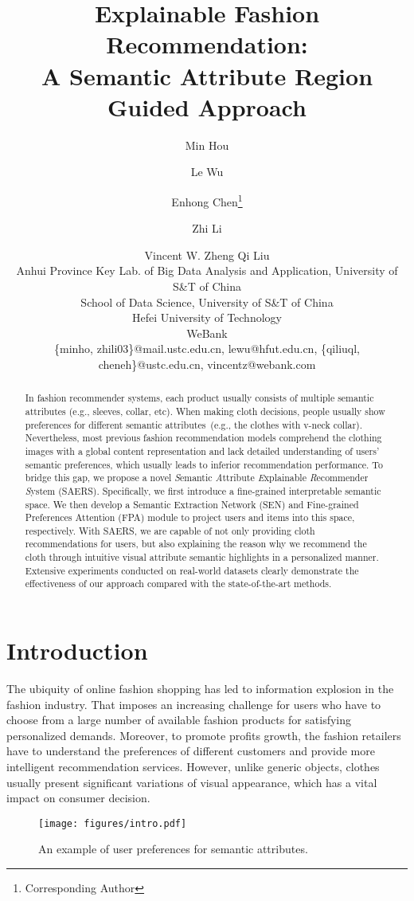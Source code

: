 \documentclass{article}
\title{Explainable Fashion Recommendation: \\A Semantic Attribute Region Guided Approach}
\author{
Min Hou\and
Le Wu\and
Enhong Chen\footnote{Corresponding Author}\and
Zhi Li\and
Vincent W. Zheng\And
Qi Liu\\
\affiliations
Anhui Province Key Lab. of Big Data Analysis and Application, University of S\&T of China\\
School of Data Science, University of S\&T of China\\
Hefei University of Technology\\
WeBank\\
\emails
\{minho, zhili03\}@mail.ustc.edu.cn,
lewu@hfut.edu.cn,
\{qiliuql, cheneh\}@ustc.edu.cn,
vincentz@webank.com
}
\begin{document}
\maketitle

\begin{abstract}

 In fashion recommender systems, each product usually consists of multiple semantic attributes (e.g., sleeves, collar, etc). When making cloth decisions, people usually show preferences for different semantic attributes~(e.g., the clothes with v-neck collar). Nevertheless, most previous fashion recommendation models comprehend the clothing images with a global content representation and lack detailed understanding of users' semantic preferences, which usually leads to inferior recommendation performance. To bridge this gap, we propose a novel \textit{S}emantic \textit{A}ttribute \textit{E}xplainable \textit{R}ecommender \textit{S}ystem (SAERS). Specifically, we first introduce a fine-grained interpretable semantic space. We then develop a Semantic Extraction Network (SEN) and Fine-grained Preferences Attention (FPA) module to project users and items into this space, respectively.  With SAERS, we are capable of not only providing cloth recommendations for users, but also explaining the reason why we recommend the cloth through intuitive visual attribute semantic highlights in a personalized manner. Extensive experiments conducted on real-world datasets clearly demonstrate the effectiveness of our approach compared with the state-of-the-art methods.
  
\end{abstract}


\section{Introduction}

The ubiquity of online fashion shopping has led to information explosion in the fashion industry. That imposes an increasing challenge for users who have to choose from a large number of available fashion products for satisfying personalized demands. Moreover, to promote profits growth, the fashion retailers have to understand the preferences of different customers and provide more intelligent recommendation services. However, unlike generic objects, clothes usually present significant variations of visual appearance, which has a vital impact on consumer decision.
\begin{figure}
    \centering
	\texttt{[image: figures/intro.pdf]}\caption{An example of user preferences for semantic attributes.}
    \centering
    \bigskip
    \label{fig:intro}
\end{figure}
\end{document}
